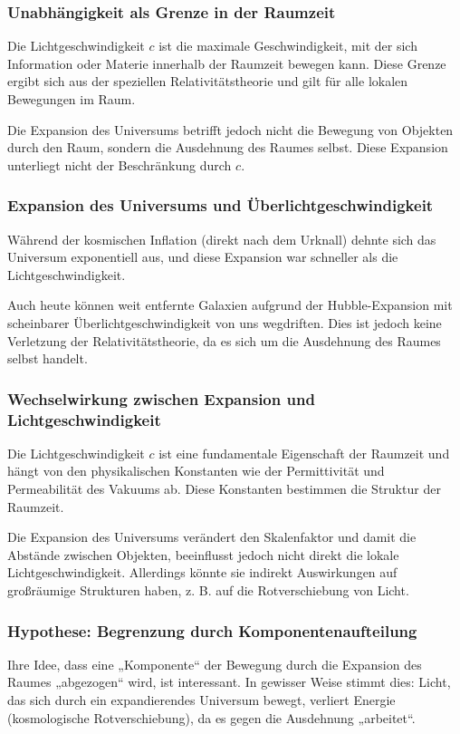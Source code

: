 \documentclass[a4paper,12pt]{article}
\begin{document}
	\subsubsection{Unabhängigkeit als Grenze in der Raumzeit}
	Die Lichtgeschwindigkeit \( c \) ist die maximale Geschwindigkeit, mit der sich Information oder Materie innerhalb der Raumzeit bewegen kann. Diese Grenze ergibt sich aus der speziellen Relativitätstheorie und gilt für alle lokalen Bewegungen im Raum.
	
	Die Expansion des Universums betrifft jedoch nicht die Bewegung von Objekten durch den Raum, sondern die Ausdehnung des Raumes selbst. Diese Expansion unterliegt nicht der Beschränkung durch \( c \).
	
	\subsubsection{Expansion des Universums und Überlichtgeschwindigkeit}
	Während der kosmischen Inflation (direkt nach dem Urknall) dehnte sich das Universum exponentiell aus, und diese Expansion war schneller als die Lichtgeschwindigkeit.
	
	Auch heute können weit entfernte Galaxien aufgrund der Hubble-Expansion mit scheinbarer Überlichtgeschwindigkeit von uns wegdriften. Dies ist jedoch keine Verletzung der Relativitätstheorie, da es sich um die Ausdehnung des Raumes selbst handelt.
	
	\subsubsection{Wechselwirkung zwischen Expansion und Lichtgeschwindigkeit}
	Die Lichtgeschwindigkeit \( c \) ist eine fundamentale Eigenschaft der Raumzeit und hängt von den physikalischen Konstanten wie der Permittivität und Permeabilität des Vakuums ab. Diese Konstanten bestimmen die Struktur der Raumzeit.
	
	Die Expansion des Universums verändert den Skalenfaktor und damit die Abstände zwischen Objekten, beeinflusst jedoch nicht direkt die lokale Lichtgeschwindigkeit. Allerdings könnte sie indirekt Auswirkungen auf großräumige Strukturen haben, z. B. auf die Rotverschiebung von Licht.
	
	\subsubsection{Hypothese: Begrenzung durch Komponentenaufteilung}
	Ihre Idee, dass eine „Komponente“ der Bewegung durch die Expansion des Raumes „abgezogen“ wird, ist interessant. In gewisser Weise stimmt dies: Licht, das sich durch ein expandierendes Universum bewegt, verliert Energie (kosmologische Rotverschiebung), da es gegen die Ausdehnung „arbeitet“.
	
\end{document}
